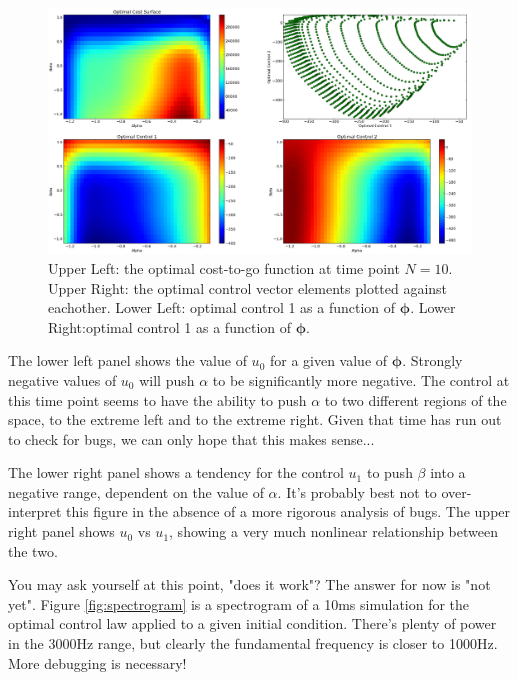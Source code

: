 \documentclass{article} %
\begin{document}
\begin{figure}[h]
\centering
\includegraphics[width=1.0\textwidth]{images/cost_and_control.png}
\caption{Upper Left: the optimal cost-to-go function at time point $N=10$.
         Upper Right: the optimal control vector elements plotted against eachother.
         Lower Left: optimal control 1 as a function of $\bm{\phi}$.
         Lower Right:optimal control 1 as a function of $\bm{\phi}$. }
\label{fig:cost_and_control}
\end{figure}

The lower left panel shows the value of $u_0$ for a given
value of $\bm{\phi}$. Strongly negative values of $u_0$ will push $\alpha$ to be significantly
more negative. The control at this time point seems to have the ability to push $\alpha$ to
two different regions of the space, to the extreme left and to the extreme right. Given
that time has run out to check for bugs, we can only hope that this makes sense...

The lower right panel shows a tendency for the control $u_1$ to push $\beta$ into a negative
range, dependent on the value of $\alpha$. It's probably best not to over-interpret this
figure in the absence of a more rigorous analysis of bugs. The upper right panel shows
$u_0$ vs $u_1$, showing a very much nonlinear relationship between the two.

You may ask yourself at this point, "does it work"? The answer for now is "not yet". Figure
\ref{fig:spectrogram} is a spectrogram of a 10ms simulation for the optimal control law
applied to a given initial condition. There's plenty of power in the 3000Hz range, but clearly
the fundamental frequency is closer to 1000Hz. More debugging is necessary!
\end{document}
